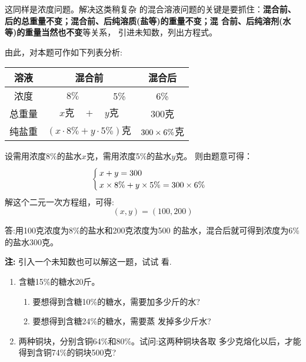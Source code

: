 \begin{analyze}
这同样是浓度问题。解决这类稍复杂
的混合溶液问题的关键是要抓住：\textbf{混合前、后的总重量不变；混合前、后纯溶质(盐等)的重量不变；混
合前、后纯溶剂(水等)的重量当然也不变}等关系，
引进未知数，列出方程式。

    由此，对本题可作如下列表分析:
\begin{center}
\begin{tabular}{|c|c|c|c|}
\hline
溶液  & \multicolumn{2}{c|}{混合前} &混合后\\
\hline
浓度 & $\quad8\%\quad$  & 5\% & 6\%\\
\hline
总重量& \multicolumn{2}{c|}{$x\text{克}\quad +\quad y\text{克}$} &300克\\
\hline
纯盐重  & \multicolumn{2}{c|}{$(x\cdot 8\%+y\cdot 5\%)\text{克}$} &$300\times 6\%$克\\
\hline
\end{tabular}
\end{center}
 \end{analyze}


\begin{solution}
设需用浓度8\%的盐水$x$克，需用浓度5\%的盐水$y$克。
    则由题意可得：
\[\begin{cases}
    x+y=300\\
    x\times 8\% +y\times 5\%=300\times 6\%
\end{cases}\]
    解这个二元一次方程组，可得:
           \[(x,y)=(100,200) \]

    答:用100克浓度为8\%的盐水和200克浓度为500
的盐水，混合后就可得到浓度为6\%的盐水300克。

\textbf{注:} 引入一个未知数也可以解这一题，试试
看.
    
\end{solution}

\begin{ex}
\begin{enumerate}
    \item 含糖15\%的糖水20斤。
    \begin{enumerate}
        \item 要想得到含糖10\%的糖水，需要加多少斤的水?
        \item 要想得到含糖24\%的糖水，需要蒸
发掉多少斤水?
    \end{enumerate} 
\item 两种铜块，分别含铜64\%和80\%。试问:这两种铜块各取
多少克熔化以后，才能得到含铜74\%的铜块500克?
\end{enumerate}
 \end{ex}



